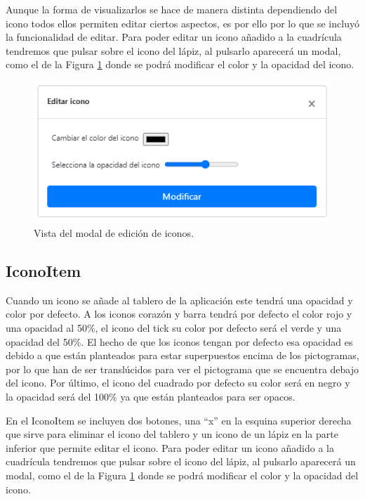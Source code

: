  
Aunque la forma de visualizarlos se hace de manera distinta dependiendo del icono todos ellos permiten editar ciertos aspectos, es por ello por lo que se incluyó la funcionalidad de editar. Para poder editar un icono añadido a la cuadrícula tendremos que pulsar sobre el icono del lápiz, al pulsarlo aparecerá un modal, como el de la Figura \ref{fig:modalpictoitem} donde se podrá modificar el color y la opacidad del icono.  

\begin{figure}[h!]
	\centering
	\includegraphics[width=0.7\linewidth]{Imagenes/Bitmap/modalPictoItem}
	\caption{Vista del modal de edición de iconos.}
	\label{fig:modalpictoitem}
\end{figure}

\subsection{IconoItem}

Cuando un icono se añade al tablero de la aplicación este tendrá una opacidad y color por defecto. A los iconos corazón y barra tendrá por defecto el color rojo y una opacidad al 50\%, el icono del tick su color por defecto será el verde y una opacidad del 50\%. El hecho de que los iconos tengan por defecto esa opacidad es debido a que están planteados para estar superpuestos encima de los pictogramas, por lo que han de ser translúcidos para ver el pictograma que se encuentra debajo del icono. Por último, el icono del cuadrado por defecto su color será en negro y la opacidad será del 100\% ya que están planteados para ser opacos.

En el IconoItem se incluyen dos botones, una “x” en la esquina superior derecha que sirve para eliminar el icono del tablero y un icono de un lápiz en la parte inferior que permite editar el icono. Para poder editar un icono añadido a la cuadrícula tendremos que pulsar sobre el icono del lápiz, al pulsarlo aparecerá un modal, como el de la Figura \ref{fig:modalpictoitem} donde se podrá modificar el color y la opacidad del icono.

